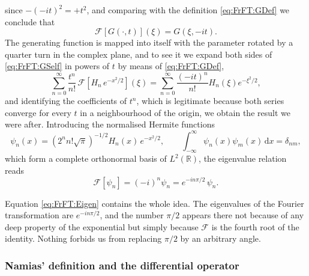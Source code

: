 			since $-(-it)^{2} = +t^{2}$, and comparing with the definition \eqref{eq:FrFT:GDef} we conclude that
			\begin{equation}\label{eq:FrFT:GSelf}
				\mathcal{F}\left[G(\cdot,t)\right](\xi) = G(\xi,-it).
			\end{equation}
			The generating function is mapped into itself with the parameter rotated by a quarter turn in the complex plane, and to see it we expand both sides of \eqref{eq:FrFT:GSelf} in powers of $t$ by means of \eqref{eq:FrFT:GDef},
			\begin{equation*}
				\sum_{n=0}^{\infty}\frac{t^{n}}{n!}\,\mathcal{F}\!\left[H_{n}\,e^{-x^{2}/2}\right](\xi) = \sum_{n=0}^{\infty}\frac{\left(-it\right)^{n}}{n!}H_{n}(\xi)e^{-\xi^{2}/2},
			\end{equation*}
			and identifying the coefficients of $t^{n}$, which is legitimate because both series converge for every $t$ in a neighbourhood of the origin, we obtain the result we were after. Introducing the normalised Hermite functions
			\begin{equation}\label{eq:FrFT:HermiteFunctions}
				\psi_{n}(x) = \left(2^{n}n!\sqrt{\pi}\right)^{-1/2}H_{n}(x)\,e^{-x^{2}/2}, \qquad \int_{-\infty}^{\infty}\psi_{n}(x)\psi_{m}(x)\,\mathrm{d}x = \delta_{nm},
			\end{equation}
			which form a complete orthonormal basis of $L^{2}(\mathbb{R})$, the eigenvalue relation reads
			\begin{equation}\label{eq:FrFT:Eigen}
				\mathcal{F}\left[\psi_{n}\right] = \left(-i\right)^{n}\psi_{n} = e^{-in\pi/2}\,\psi_{n}.
			\end{equation}

			Equation \eqref{eq:FrFT:Eigen} contains the whole idea. The eigenvalues of the Fourier transformation are $e^{-in\pi/2}$, and the number $\pi/2$ appears there not because of any deep property of the exponential but simply because $\mathcal{F}$ is the fourth root of the identity. Nothing forbids us from replacing $\pi/2$ by an arbitrary angle.

		\subsubsection{Namias' definition and the differential operator}

